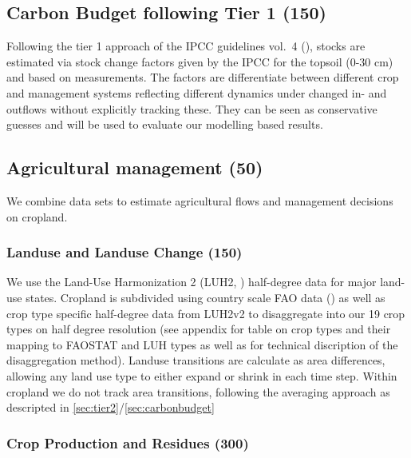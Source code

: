 \documentclass[gc, manuscript]{copernicus}
\begin{document}
\newpage

\hypertarget{sec:tier1}{%
\subsection{Carbon Budget following Tier 1 (150)}\label{sec:tier1}}

Following the tier 1 approach of the IPCC guidelines vol.~4 (\citet{ipcc_2006_2006}), stocks are estimated via stock change factors given by the IPCC for the topsoil (0-30 cm) and based on measurements. The factors are differentiate between different crop and management systems reflecting different dynamics under changed in- and outflows without explicitly tracking these. They can be seen as conservative guesses and will be used to evaluate our modelling based results.

\hypertarget{sec:agrimanagement}{%
\subsection{Agricultural management (50)}\label{sec:agrimanagement}}

We combine data sets to estimate agricultural flows and management decisions on cropland.

\hypertarget{sec:landuse}{%
\subsubsection{Landuse and Landuse Change (150)}\label{sec:landuse}}

We use the Land-Use Harmonization 2 (LUH2, \citep{LUH2}) half-degree data for major land-use states. Cropland is subdivided using country scale FAO data (\citep{FAOSTAT}) as well as crop type specific half-degree data from LUH2v2 to disaggregate into our 19 crop types on half degree resolution (see appendix for table on crop types and their mapping to FAOSTAT and LUH types as well as for technical discription of the disaggregation method).
Landuse transitions are calculate as area differences, allowing any land use type to either expand or shrink in each time step. Within cropland we do not track area transitions, following the averaging approach as descripted in \ref{sec:tier2}/\ref{sec:carbonbudget}

\hypertarget{crop-production-and-residues-300}{%
\subsubsection{Crop Production and Residues (300)}\label{crop-production-and-residues-300}}
\end{document}
